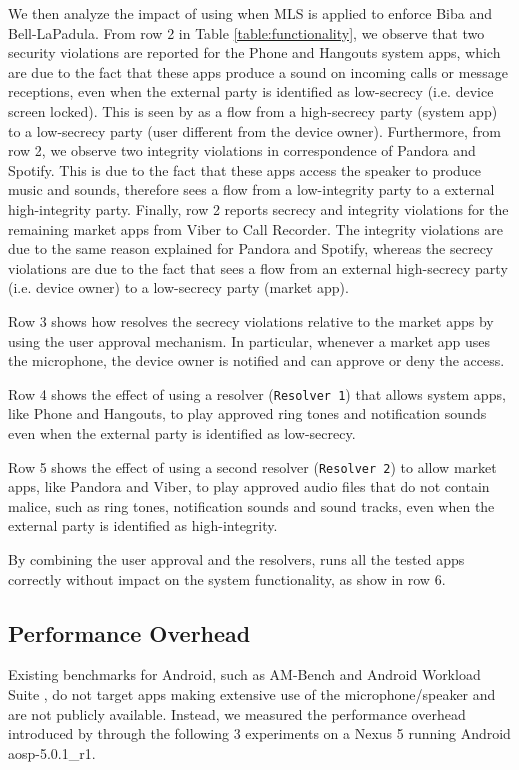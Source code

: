 We then analyze the impact of using \system when MLS is applied to enforce Biba and Bell-LaPadula. From row 2 in Table \ref{table:functionality}, we observe that two security violations are reported for the Phone and Hangouts system apps, which are due to the fact that these apps produce a sound on incoming calls or message receptions, even when the external party is identified as low-secrecy (i.e. device screen locked). This is seen by \system as a flow from a high-secrecy party (system app) to a low-secrecy party (user different from the device owner). Furthermore, from row 2, we observe two integrity violations in correspondence of Pandora and Spotify. This is due to the fact that these apps access the speaker to produce music and sounds, therefore \system sees a flow from a low-integrity party to a external high-integrity party. Finally, row 2 reports secrecy and integrity violations for the remaining market apps from Viber to Call Recorder. The integrity violations are due to the same reason explained for Pandora and Spotify, whereas the secrecy violations are due to the fact that \system sees a flow from an external high-secrecy party (i.e. device owner) to a low-secrecy party (market app). 

Row 3 shows how \system resolves the secrecy violations relative to the market apps by using the user approval mechanism. In particular, whenever a market app uses the microphone, the device owner is notified and can approve or deny the access.

Row 4 shows the effect of using a resolver (\texttt{Resolver 1}) that allows system apps, like Phone and Hangouts, to play approved ring tones and notification sounds even when the external party is identified as low-secrecy. 

Row 5 shows the effect of using a second resolver (\texttt{Resolver 2}) to allow market apps, like Pandora and Viber, to play approved audio files that do not contain malice, such as ring tones, notification sounds and sound tracks, even when the external party is identified as high-integrity.

By combining the user approval and the resolvers, \system runs all the tested apps correctly without impact on the system functionality, as show in row 6.

\subsection{Performance Overhead}

Existing benchmarks for Android, such as AM-Bench \cite{am-bench} and Android Workload Suite \cite{aws}, do not target apps making extensive use of the microphone/speaker and are not publicly available. Instead, we measured the performance overhead  introduced by \system through the following 3 experiments on a Nexus 5 running Android aosp-5.0.1\_r1. 

